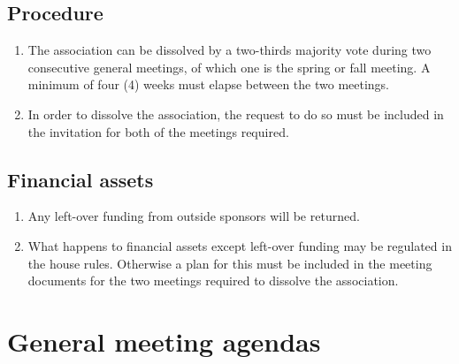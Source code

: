 \subsection{Procedure}
\begin{enumerate}
  \item The association can be dissolved by a two-thirds majority vote during two consecutive general meetings, of which one is the spring or fall meeting. A minimum of four (4) weeks must elapse between the two meetings.
  \item In order to dissolve the association, the request to do so must be included in the invitation for both of the meetings required.
\end{enumerate}

\subsection{Financial assets}
\begin{enumerate}
  \item Any left-over funding from outside sponsors will be returned.
  \item What happens to financial assets except left-over funding may be regulated in the house rules. Otherwise a plan for this must be included in the meeting documents for the two meetings required to dissolve the association.
\end{enumerate}

\cleardoublepage
\section*{General meeting agendas}

\clearpage

\cleardoublepage
